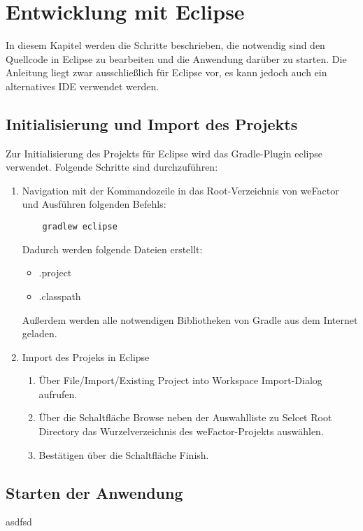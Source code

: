 
\thispagestyle{plain}

\chapter{Entwicklung mit Eclipse}\label{c_eclipse}
In diesem Kapitel werden die Schritte beschrieben, die notwendig sind den Quellcode in Eclipse zu bearbeiten und die Anwendung darüber zu starten. Die Anleitung liegt zwar ausschließlich für Eclipse vor, es kann jedoch auch ein alternatives \ac{IDE} verwendet werden.
\section{Initialisierung und Import des Projekts}\label{s_initEclipse}
Zur Initialisierung des Projekts für Eclipse wird das Gradle-Plugin eclipse verwendet. Folgende Schritte sind durchzuführen:
   \begin{enumerate}

    \item Navigation mit der Kommandozeile in das Root-Verzeichnis von weFactor und Ausführen folgenden Befehls:
    \begin{lstlisting}
    gradlew eclipse
    \end{lstlisting}
    Dadurch werden folgende Dateien erstellt:
    \begin{itemize}
	    \item .project
	    \item .classpath
    \end{itemize}
    Außerdem werden alle notwendigen Bibliotheken von Gradle aus dem Internet geladen.
    \item Import des Projeks in Eclipse
       \begin{enumerate}
       	\item Über File/Import/Existing Project into Workspace Import-Dialog aufrufen.
       	\item Über die Schaltfläche Browse neben der Auswahlliste zu Selcet Root Directory das Wurzelverzeichnis des weFactor-Projekts auswählen.
       	\item Bestätigen über die Schaltfläche Finish.
       \end{enumerate}

   \end{enumerate}
   \section{Starten der Anwendung}\label{s_startFromEclipse}
   asdfsd